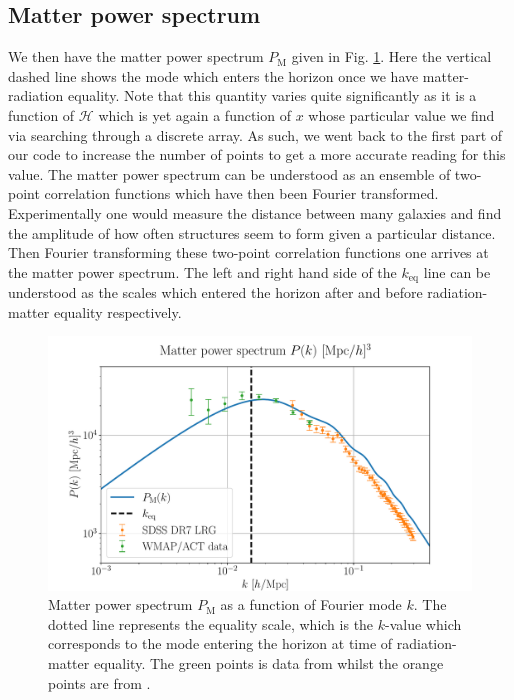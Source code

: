 \documentclass[%
reprint,
 amsmath,amssymb,
 aps,
]{revtex4-2}
\newcommand{\Hp}{\mathcal{H}}
\begin{document}
\subsection{Matter power spectrum}
We then have the matter power spectrum $P_\text{M}$ given in Fig. \ref{fig:Mat_pow}. Here the vertical dashed line shows the mode which enters the horizon once we have matter-radiation equality. Note that this quantity varies quite significantly as it is a function of $\Hp$ which is yet again a function of $x$ whose particular value we find via searching through a discrete array. As such, we went back to the first part of our code to increase the number of points to get a more accurate reading for this value. The matter power spectrum can be understood as an ensemble of two-point correlation functions which have then been Fourier transformed. Experimentally one would measure the distance between many galaxies and find the amplitude of how often structures seem to form given a particular distance. Then Fourier transforming these two-point correlation functions one arrives at the matter power spectrum. The left and right hand side of the $k_\text{eq}$ line can be understood as the scales which entered the horizon after and before radiation-matter equality respectively. 
\begin{figure}[ht!]
	\includegraphics[width = \linewidth]{Figures/Mat_pow.pdf}
	\caption{Matter power spectrum $P_\text{M}$ as a function of Fourier mode $k$. The dotted line represents the equality scale, which is the $k$-value which corresponds to the mode entering the horizon at time of radiation-matter equality. The green points is data from \cite{Hlozek_2012} whilst the orange points are from \cite{Reid_2010}.}
	\label{fig:Mat_pow}
\end{figure}
\end{document}
